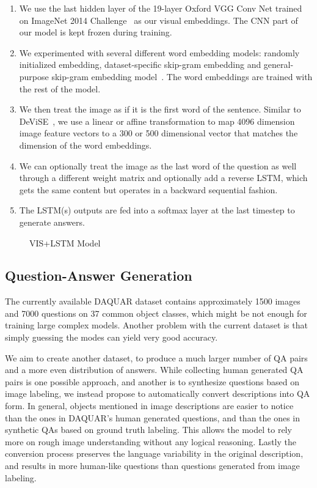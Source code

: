 \documentclass{article} %
\renewcommand{\#}[1]{\textbf{#1}}
\begin{document}
\begin{enumerate}

\item We use the last hidden layer of the 19-layer Oxford VGG Conv Net
\cite{simonyan14} trained on ImageNet 2014 Challenge~\cite{ilsvrc14} as our
visual embeddings. The CNN part of our model is kept frozen during training.

\item We experimented with several different word embedding models: randomly
initialized embedding, dataset-specific skip-gram embedding and general-purpose
skip-gram embedding model~\cite{mikolov13}. The word embeddings are trained
with the rest of the model.

\item We then treat the image as if it is the first word of the sentence.
Similar to DeViSE~\cite{frome13}, we use a linear or affine transformation to
map 4096 dimension image feature vectors to a 300 or 500 dimensional vector
that matches the dimension of the word embeddings.

\item We can optionally treat the image as the last word of the question as
well through a different weight matrix and optionally add a reverse LSTM, which
gets the same content but operates in a backward sequential fashion.

\item The LSTM(s) outputs are fed into a softmax layer at the last timestep to
generate answers.

\end{enumerate}

\begin{figure}
\centering
\scalebox{0.6}{
}
\caption{VIS+LSTM Model}
\label{fig:imgword}
\end{figure}

\subsection{Question-Answer Generation}

The currently available DAQUAR dataset contains approximately 1500 images and
7000 questions on 37 common object classes, which might be not enough for
training large complex models. Another problem with the current dataset is that
simply guessing the modes can yield very good accuracy.

We aim to create another dataset, to produce a much larger number of QA pairs
and a more even distribution of answers. While collecting human generated QA
pairs is one possible approach, and another is to synthesize questions based on
image labeling, we instead propose to automatically convert descriptions into
QA form. In general, objects mentioned in image descriptions are easier to
notice than the ones in DAQUAR's human generated questions, and than the ones
in synthetic QAs based on ground truth labeling. This allows the model to
rely more on rough image understanding without any logical reasoning. Lastly
the conversion process preserves the language variability in the original
description, and results in more human-like questions than questions generated
from image labeling.
\end{document}
